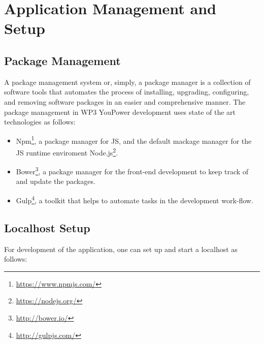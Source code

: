 \section{Application Management and Setup}

\subsection{Package Management}

A package management system or, simply, a package manager is a collection of software tools that automates the process of installing, upgrading, configuring, and removing software packages in an easier and comprehensive manner. 
The package management in WP3 YouPower development uses state of the art technologies as follows: 

\begin{itemize}
\item Npm\footnote{\url{https://www.npmjs.com/}}, a package manager for JS,  and the default mackage manager for the JS runtime enviroment Node.js\footnote{\url{https://nodejs.org/}}. 

\item Bower\footnote{\url{http://bower.io/}}, a package manager for the front-end development to keep track of and update the packages. 

\item Gulp\footnote{\url{http://gulpjs.com/}}, a toolkit that helps to automate tasks in the development work-flow. 

\end{itemize}

\subsection{Localhost Setup}

For development of the application, one can set up and start a localhost as follows: 

